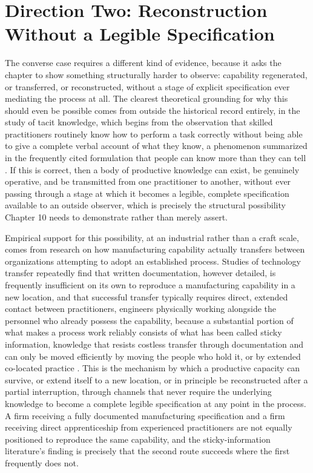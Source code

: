 \documentclass[11pt]{book}
\begin{document}
\section{Direction Two: Reconstruction Without a Legible Specification}

The converse case requires a different kind of evidence, because it asks the chapter to show something structurally harder to observe: capability regenerated, or transferred, or reconstructed, without a stage of explicit specification ever mediating the process at all. The clearest theoretical grounding for why this should even be possible comes from outside the historical record entirely, in the study of tacit knowledge, which begins from the observation that skilled practitioners routinely know how to perform a task correctly without being able to give a complete verbal account of what they know, a phenomenon summarized in the frequently cited formulation that people can know more than they can tell \cite{polanyi1966}. If this is correct, then a body of productive knowledge can exist, be genuinely operative, and be transmitted from one practitioner to another, without ever passing through a stage at which it becomes a legible, complete specification available to an outside observer, which is precisely the structural possibility Chapter 10 needs to demonstrate rather than merely assert.

Empirical support for this possibility, at an industrial rather than a craft scale, comes from research on how manufacturing capability actually transfers between organizations attempting to adopt an established process. Studies of technology transfer repeatedly find that written documentation, however detailed, is frequently insufficient on its own to reproduce a manufacturing capability in a new location, and that successful transfer typically requires direct, extended contact between practitioners, engineers physically working alongside the personnel who already possess the capability, because a substantial portion of what makes a process work reliably consists of what has been called sticky information, knowledge that resists costless transfer through documentation and can only be moved efficiently by moving the people who hold it, or by extended co-located practice \cite{vonhippel1994}. This is the mechanism by which a productive capacity can survive, or extend itself to a new location, or in principle be reconstructed after a partial interruption, through channels that never require the underlying knowledge to become a complete legible specification at any point in the process. A firm receiving a fully documented manufacturing specification and a firm receiving direct apprenticeship from experienced practitioners are not equally positioned to reproduce the same capability, and the sticky-information literature's finding is precisely that the second route succeeds where the first frequently does not.
\end{document}
